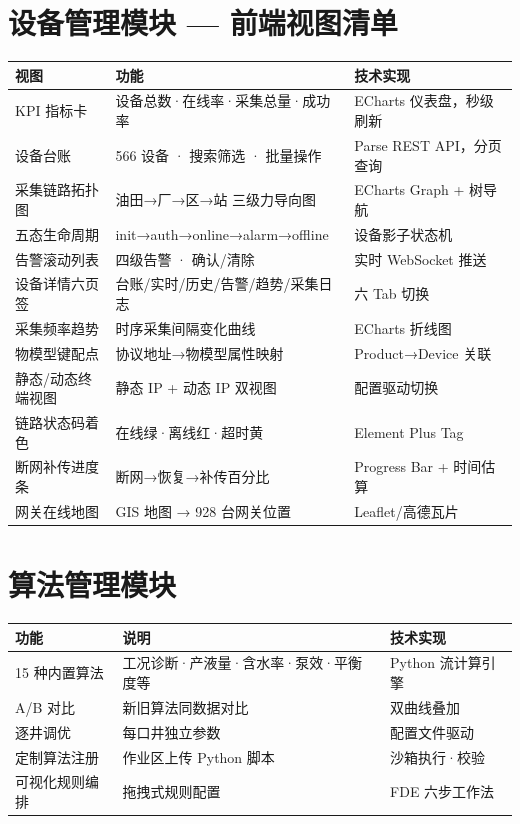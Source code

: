 \documentclass[10pt,a4paper]{ctexart}
\begin{document}
\newpage

\section*{设备管理模块 — 前端视图清单}

\begin{table}[H]\centering\small
\begin{tabular}{p{2.5cm}p{6cm}p{6cm}}
\toprule
\textbf{视图} & \textbf{功能} & \textbf{技术实现} \\
\midrule
KPI 指标卡 & 设备总数·在线率·采集总量·成功率 & ECharts 仪表盘，秒级刷新 \\
设备台账 & 566 设备 · 搜索筛选 · 批量操作 & Parse REST API，分页查询 \\
采集链路拓扑图 & 油田→厂→区→站 三级力导向图 & ECharts Graph + 树导航 \\
五态生命周期 & init→auth→online→alarm→offline & 设备影子状态机 \\
告警滚动列表 & 四级告警 · 确认/清除 & 实时 WebSocket 推送 \\
设备详情六页签 & 台账/实时/历史/告警/趋势/采集日志 & 六 Tab 切换 \\
采集频率趋势 & 时序采集间隔变化曲线 & ECharts 折线图 \\
物模型键配点 & 协议地址→物模型属性映射 & Product→Device 关联 \\
静态/动态终端视图 & 静态 IP + 动态 IP 双视图 & 配置驱动切换 \\
链路状态码着色 & 在线绿·离线红·超时黄 & Element Plus Tag \\
断网补传进度条 & 断网→恢复→补传百分比 & Progress Bar + 时间估算 \\
网关在线地图 & GIS 地图 → 928 台网关位置 & Leaflet/高德瓦片 \\
\bottomrule
\end{tabular}
\end{table}

\section*{算法管理模块}

\begin{table}[H]\centering\small
\begin{tabular}{p{2.5cm}p{6cm}p{6cm}}
\toprule
\textbf{功能} & \textbf{说明} & \textbf{技术实现} \\
\midrule
15 种内置算法 & 工况诊断·产液量·含水率·泵效·平衡度等 & Python 流计算引擎 \\
A/B 对比 & 新旧算法同数据对比 & 双曲线叠加 \\
逐井调优 & 每口井独立参数 & 配置文件驱动 \\
定制算法注册 & 作业区上传 Python 脚本 & 沙箱执行·校验 \\
可视化规则编排 & 拖拽式规则配置 & FDE 六步工作法 \\
\bottomrule
\end{tabular}
\end{table}
\end{document}
